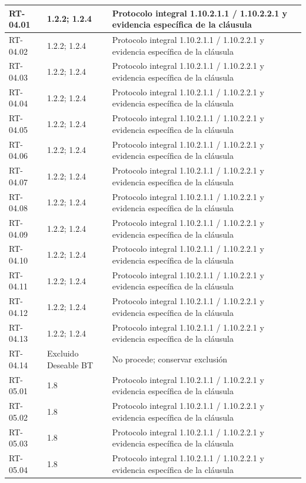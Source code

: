 \begin{longtable}{L{23mm}L{46mm}L{72mm}}
RT-04.01 & 1.2.2; 1.2.4 & Protocolo integral 1.10.2.1.1 / 1.10.2.2.1 y evidencia específica de la cláusula\\\hline
RT-04.02 & 1.2.2; 1.2.4 & Protocolo integral 1.10.2.1.1 / 1.10.2.2.1 y evidencia específica de la cláusula\\\hline
RT-04.03 & 1.2.2; 1.2.4 & Protocolo integral 1.10.2.1.1 / 1.10.2.2.1 y evidencia específica de la cláusula\\\hline
RT-04.04 & 1.2.2; 1.2.4 & Protocolo integral 1.10.2.1.1 / 1.10.2.2.1 y evidencia específica de la cláusula\\\hline
RT-04.05 & 1.2.2; 1.2.4 & Protocolo integral 1.10.2.1.1 / 1.10.2.2.1 y evidencia específica de la cláusula\\\hline
RT-04.06 & 1.2.2; 1.2.4 & Protocolo integral 1.10.2.1.1 / 1.10.2.2.1 y evidencia específica de la cláusula\\\hline
RT-04.07 & 1.2.2; 1.2.4 & Protocolo integral 1.10.2.1.1 / 1.10.2.2.1 y evidencia específica de la cláusula\\\hline
RT-04.08 & 1.2.2; 1.2.4 & Protocolo integral 1.10.2.1.1 / 1.10.2.2.1 y evidencia específica de la cláusula\\\hline
RT-04.09 & 1.2.2; 1.2.4 & Protocolo integral 1.10.2.1.1 / 1.10.2.2.1 y evidencia específica de la cláusula\\\hline
RT-04.10 & 1.2.2; 1.2.4 & Protocolo integral 1.10.2.1.1 / 1.10.2.2.1 y evidencia específica de la cláusula\\\hline
RT-04.11 & 1.2.2; 1.2.4 & Protocolo integral 1.10.2.1.1 / 1.10.2.2.1 y evidencia específica de la cláusula\\\hline
RT-04.12 & 1.2.2; 1.2.4 & Protocolo integral 1.10.2.1.1 / 1.10.2.2.1 y evidencia específica de la cláusula\\\hline
RT-04.13 & 1.2.2; 1.2.4 & Protocolo integral 1.10.2.1.1 / 1.10.2.2.1 y evidencia específica de la cláusula\\\hline
RT-04.14 & Excluido Deseable BT & No procede; conservar exclusión\\\hline
RT-05.01 & 1.8 & Protocolo integral 1.10.2.1.1 / 1.10.2.2.1 y evidencia específica de la cláusula\\\hline
RT-05.02 & 1.8 & Protocolo integral 1.10.2.1.1 / 1.10.2.2.1 y evidencia específica de la cláusula\\\hline
RT-05.03 & 1.8 & Protocolo integral 1.10.2.1.1 / 1.10.2.2.1 y evidencia específica de la cláusula\\\hline
RT-05.04 & 1.8 & Protocolo integral 1.10.2.1.1 / 1.10.2.2.1 y evidencia específica de la cláusula\\\hline

\end{longtable}
